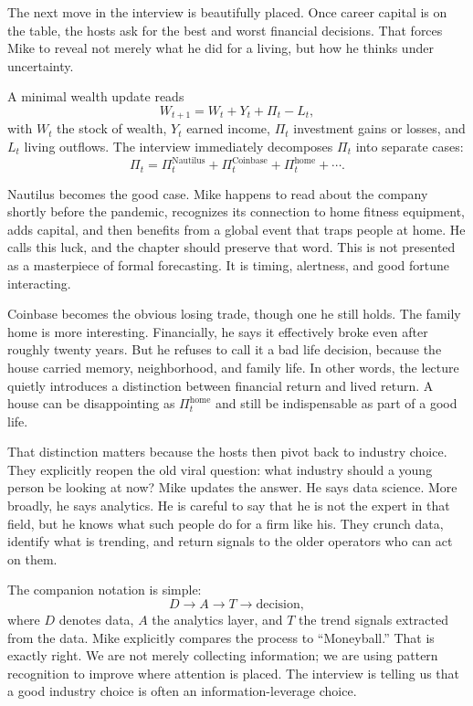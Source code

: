 The next move in the interview is beautifully placed. Once career capital is on the table, the hosts ask for the best and worst financial decisions. That forces Mike to reveal not merely what he did for a living, but how he thinks under uncertainty.

A minimal wealth update reads
\begin{equation}
W_{t+1}=W_t+Y_t+\Pi_t-L_t,
\end{equation}
with \(W_t\) the stock of wealth, \(Y_t\) earned income, \(\Pi_t\) investment gains or losses, and \(L_t\) living outflows. The interview immediately decomposes \(\Pi_t\) into separate cases:
\begin{equation}
\Pi_t=\Pi_t^{\text{Nautilus}}+\Pi_t^{\text{Coinbase}}+\Pi_t^{\text{home}}+\cdots.
\end{equation}

Nautilus becomes the good case. Mike happens to read about the company shortly before the pandemic, recognizes its connection to home fitness equipment, adds capital, and then benefits from a global event that traps people at home. He calls this luck, and the chapter should preserve that word. This is not presented as a masterpiece of formal forecasting. It is timing, alertness, and good fortune interacting.

Coinbase becomes the obvious losing trade, though one he still holds. The family home is more interesting. Financially, he says it effectively broke even after roughly twenty years. But he refuses to call it a bad life decision, because the house carried memory, neighborhood, and family life. In other words, the lecture quietly introduces a distinction between financial return and lived return. A house can be disappointing as \(\Pi_t^{\text{home}}\) and still be indispensable as part of a good life.

That distinction matters because the hosts then pivot back to industry choice. They explicitly reopen the old viral question: what industry should a young person be looking at now? Mike updates the answer. He says data science. More broadly, he says analytics. He is careful to say that he is not the expert in that field, but he knows what such people do for a firm like his. They crunch data, identify what is trending, and return signals to the older operators who can act on them.

The companion notation is simple:
\begin{equation}
D \rightarrow A \rightarrow T \rightarrow \text{decision},
\end{equation}
where \(D\) denotes data, \(A\) the analytics layer, and \(T\) the trend signals extracted from the data. Mike explicitly compares the process to ``Moneyball.'' That is exactly right. We are not merely collecting information; we are using pattern recognition to improve where attention is placed. The interview is telling us that a good industry choice is often an information-leverage choice.

